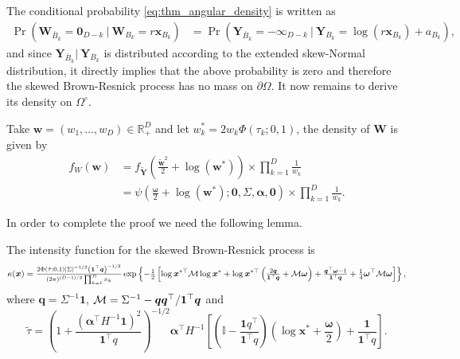 \documentclass[12pt]{article}
\begin{document}
The conditional probability \eqref{eq:thm_angular_density} is written as
%
\begin{align*}
\Pr(\bm W_{\bar{B}_k} = \bm 0_{D-k} \ | \ \bm W_{B_k} = r \bm x_{B_k} )
& = \Pr(\bm Y_{\bar{B}_k} = - \bm \infty_{D-k} \ | \ \bm Y_{B_k} = \log(r \bm x_{B_k}) + a_{B_k} ),
\end{align*}
and since $\bm Y_{\bar{B}_k}| \ \bm Y_{B_k}$ is distributed according to the extended skew-Normal distribution, it directly implies that the above probability is zero and therefore the skewed Brown-Resnick process has no mass on $\partial\Omega$. It now remains to derive its density on $\Omega^\circ$.

Take $\bm w = (w_1, \ldots, w_D) \in \mathbb{R}^D_+$ and let $w_k^{*} = 2w_k \Phi \left( \tau_k;0,1 \right)$, the density of $\bm W$ is given by
%
\begin{align}
\label{eq:fW_BR}
f_W(\bm w) &= f_{\tilde{\bm Y}} \left( \frac{\tilde{\bm w}^2}{2} + \log\left(\bm w^{*}\right) \right) \times \prod_{k=1}^D \frac{1}{w_k} \nonumber \\
&= \psi\left( \frac{\bm\omega}{2} + \log\left(\bm w^{*}\right); \bm 0, \Sigma, \bm \alpha, \bm 0\right) \times \prod_{k=1}^D \frac{1}{w_k}.
\end{align}
%

In order to complete the proof we need the following lemma.

\begin{lemma}
\label{lem:kappSBR}
The intensity function for the skewed Brown-Resnick process is
$$
\kappa(\bm x) ={\textstyle{2\Phi(\tilde{\tau};0,1)| \Sigma |^{-1/2} \left( \bm 1^\top \bm q\right)^{-1/2}\over\left( 2\pi \right)^{(D-1)/2}\prod_{k=1}^Dx_k}}\exp \left\{ -{\textstyle{1\over2}} \left[ \log \bm x^{*\top} {\mathcal M} \log \bm x^* + \log \bm x^{*\top} \left( {\textstyle{2 \bm q\over\bm 1^\top \bm q}}+{\mathcal M}\bm\omega\right) + {\textstyle{\bm q^\top \bm \omega - 1\over\bm 1 ^\top \bm q }} + {\textstyle{1\over4}}{\bm\omega}^\top{\mathcal M} \bm\omega \right]\right\},
$$
where $\bm q = \Sigma^{-1} \bm 1$, ${\mathcal M} = \Sigma^{-1} - \bm q \bm q^\top / \bm 1^\top \bm q$ and
%
$$\tilde{\tau}=\left(1 + \frac{\left(\bm\alpha^\top H^{-1}\bm 1\right)^2}{\bm 1^\top q}\right)^{-1/2}\bm\alpha^\top H^{-1}\left[\left(\mathbb{I} - \frac{\bm 1q^\top}{\bm 1^\top q}\right)\left(\log \bm x^* + \frac{\bm\omega}{2}\right) +  \frac{\bm 1}{\bm 1^\top q} \right].$$
\end{lemma}
\end{document}
